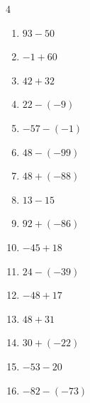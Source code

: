 \begin{multicols}{4}
\begin{enumerate}
        \phantom{$=86$}

  \item $93-50$

        \phantom{$=43$}

  \item $-1+60$

        \phantom{$=59$}

  \item $42+32$

        \phantom{$=74$}

  \item $22-(-9)$

        \phantom{$=31$}

  \item $-57-(-1)$

        \phantom{$=-56$}

  \item $48-(-99)$

        \phantom{$=147$}

  \item $48+(-88)$

        \phantom{$=-40$}

  \item $13-15$

        \phantom{$=-2$}

  \item $92+(-86)$

        \phantom{$=6$}

  \item $-45+18$

        \phantom{$=-27$}

\columnbreak %

  \item $24-(-39)$

        \phantom{$=63$}

  \item $-48+17$

        \phantom{$=-31$}

  \item $48+31$

        \phantom{$=79$}

  \item $30+(-22)$

        \phantom{$=8$}

  \item $-53-20$

        \phantom{$=-73$}

  \item $-82-(-73)$


\end{enumerate}
\end{multicols}
